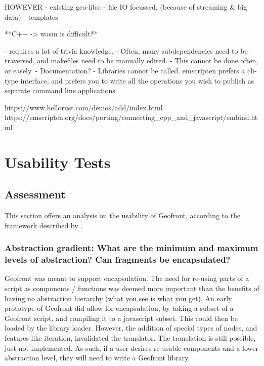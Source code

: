 \begin{note}
  
  HOWEVER 
  - existing geo-libs: 
    - file IO focussed, (because of streaming \& big data)
    - templates
  
  **C++ -> wasm is difficult**
  
  - requires a lot of trivia knowledge. 
    - Often, many subdependencies need to be traversed, and makefiles need to be manually edited. 
    - This cannot be done often, or easely. 
  - Documentation?
  - Libraries cannot be called. emscripten prefers a cli-type interface, and prefers you to write all the operations you wish to publish as separate command line applications. 

  https://www.hellorust.com/demos/add/index.html
  https://emscripten.org/docs/porting/connecting_cpp_and_javascript/embind.html

\end{note}

\section{Usability Tests}
\label{sec:testing:usability}




\subsection{Assessment}

This section offers an analysis on the usability of Geofront, according to the framework described by \cite[]{green_usability_1996}.

\subsubsection*{Abstraction gradient: What are the minimum and maximum levels of abstraction? Can fragments be encapsulated?}

Geofront was meant to support encapsulation. 
The need for re-using parts of a script as components / functions was deemed more important than the benefits of having no abstraction hierarchy (what you see is what you get).
An early prototype of Geofront did allow for encapsulation, by taking a subset of a Geofront script, and compiling it to a javascript subset. This could then be loaded by the library loader. 
However, the addition of special types of nodes, and features like iteration, invalidated the  translator.
The translation is still possible, just not implemented.  
As such, if a user desires re-usable components and a lower abstraction level, they will need to write a Geofront library.

